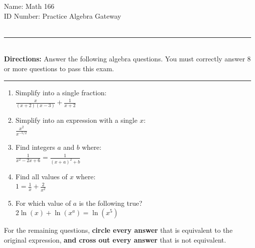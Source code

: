\documentclass{article}
\makeatletter
\def\saveenum{\xdef\@savedenum{\the\c@enumi\relax}}
\makeatother
\begin{document}
\large
\noindent Name: \underline{\hspace{2.5 in}}  \hfill Math 166\\
\noindent ID Number: \underline{\hspace{2.5 in}} \hfill Practice Algebra Gateway \\\ 

\pagestyle{empty}
\hrule\ \\
{\bf Directions:} Answer the following algebra questions.  You must correctly answer 8 or more questions to pass this exam.\\

\hrule
\begin{enumerate}
\item Simplify into a single fraction: \,\\[.1 in]
 $\displaystyle \frac{x}{(x+2)(x-3)} + \frac{1}{x+2}$\\
\- \hfill \underline{\hspace{2 in}} 
%
%
\item Simplify into an expression with a single $x$:  \,\\[.1 in]
$\displaystyle \frac{x^{2}}{x^{-5/2}}$\hfill \underline{\hspace{2 in}}
%
%
\item Find integers $a$ and $b$ where:  \,\\[.1 in]
$\displaystyle \frac{1}{x^2 - 2x  + 6} = \frac{1}{(x + a)^2 + b}$ \hfill \underline{\hspace{2 in}}
%
%
\item Find all values of $x$ where:  \,\\[.1 in]
$\displaystyle 1 = \frac{1}{x} + \frac{2}{x^2}$ \hfill \underline{\hspace{2 in}}
%
%
\item For which value of $a$ is the following true? \,\\[.1 in]
$\displaystyle 2\ln(x) + \ln(x^a) = \ln(x^5)$ \hfill \underline{\hspace{2 in}}
%
%
\end{enumerate}
\saveenum
For the remaining questions, {\bf circle every answer} that is equivalent to the original expression, {\bf and cross out every answer} that is not equivalent.
\end{document}
